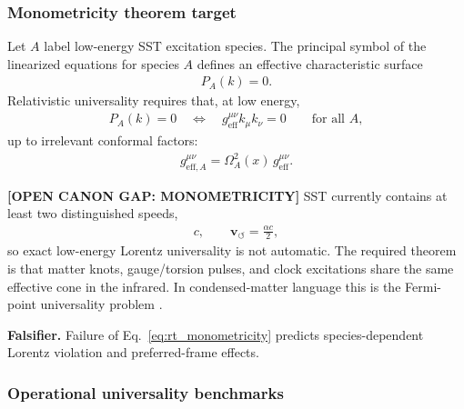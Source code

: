 \subsubsection{Monometricity theorem target}

Let \(A\) label low-energy SST excitation species. The principal symbol of the
linearized equations for species \(A\) defines an effective characteristic
surface
\begin{align}
    P_A(k)=0 .
\end{align}
Relativistic universality requires that, at low energy,
\begin{align}
    P_A(k)=0
    \quad\Longleftrightarrow\quad
    g_{\mathrm{eff}}^{\mu\nu} k_\mu k_\nu=0
    \qquad
    \text{for all } A ,
    \label{eq:rt_monometricity}
\end{align}
up to irrelevant conformal factors:
\begin{align}
    g^{\mu\nu}_{\mathrm{eff},A}
    =
    \Omega_A^2(x)\,
    g^{\mu\nu}_{\mathrm{eff}} .
\end{align}

\textbf{[OPEN CANON GAP: MONOMETRICITY]} SST currently contains at least two
distinguished speeds,
\begin{align}
    c,
    \qquad
    \mathbf{v}_{\!\boldsymbol{\circlearrowleft}}
    =
    \frac{\alpha c}{2},
\end{align}
so exact low-energy Lorentz universality is not automatic. The required theorem
is that matter knots, gauge/torsion pulses, and clock excitations share the
same effective cone in the infrared. In condensed-matter language this is the
Fermi-point universality problem \cite{Volovik2003}.

\textbf{Falsifier.} Failure of Eq.~\eqref{eq:rt_monometricity} predicts
species-dependent Lorentz violation and preferred-frame effects.

\subsubsection{Operational universality benchmarks}

